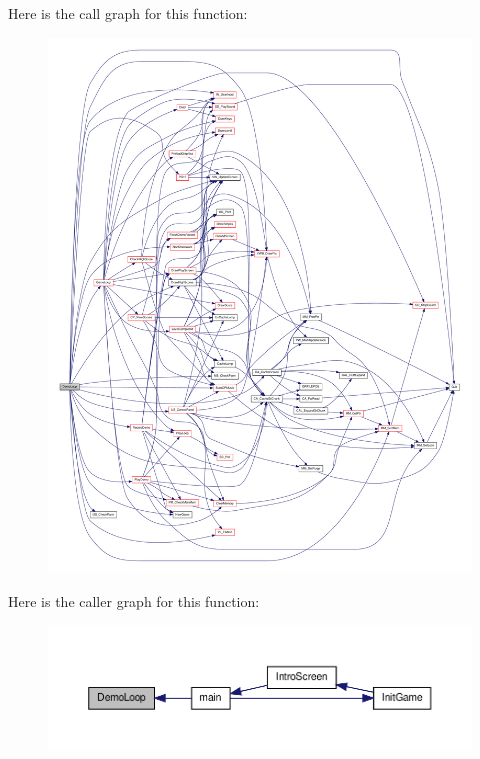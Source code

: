 Here is the call graph for this function:
\nopagebreak
\begin{figure}[H]
\begin{center}
\leavevmode
\includegraphics[width=400pt]{WL__MAIN_8C_aee1eb6a4b164d3763069996adb02f1b5_cgraph}
\end{center}
\end{figure}




Here is the caller graph for this function:
\nopagebreak
\begin{figure}[H]
\begin{center}
\leavevmode
\includegraphics[width=400pt]{WL__MAIN_8C_aee1eb6a4b164d3763069996adb02f1b5_icgraph}
\end{center}
\end{figure}


